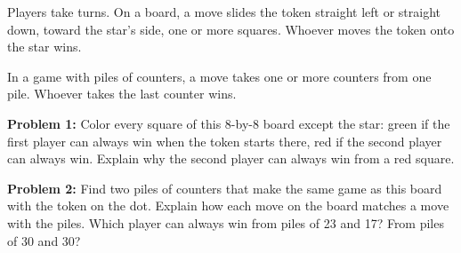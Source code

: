 \documentclass[12pt]{extarticle}
\newcommand{\prob}[1]{\textbf{Problem #1:}}
\begin{document}
\raggedright
\noindent\begin{minipage}[c]{4.9in}\raggedright
Players take turns. On a board, a move slides the token straight left or straight down, toward the star's side, one or more squares. Whoever moves the token onto the star wins.

\vspace{0.12in}
In a game with piles of counters, a move takes one or more counters from one pile. Whoever takes the last counter wins.
\end{minipage}\hfill\begin{minipage}[c]{1.8in}\raggedleft
{}
\end{minipage}

\vspace{0.35in}
\prob{1} Color every square of this 8-by-8 board except the star: green if the first player can always win when the token starts there, red if the second player can always win. Explain why the second player can always win from a red square.

\vspace{0.2in}
\begin{center}
\end{center}
\newpage
\prob{2} Find two piles of counters that make the same game as this board with the token on the dot. Explain how each move on the board matches a move with the piles. Which player can always win from piles of 23 and 17? From piles of 30 and 30?
\end{document}
